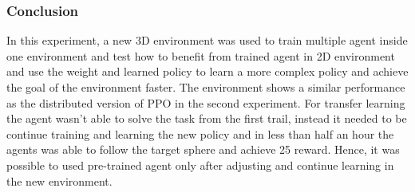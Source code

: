 \subsubsection{Conclusion}

In this experiment, a new 3D environment was used to train multiple agent inside one environment and test how to benefit from trained agent in 2D environment and use the weight and learned policy to learn a more complex policy and achieve the goal of the environment faster. The environment shows a similar performance as the distributed version of PPO in the second experiment. For transfer learning the agent wasn't able to solve the task from the first trail, instead it needed to be continue training and learning the new policy and in less than half an hour the agents was able to follow the target sphere and achieve 25 reward. Hence, it was possible to used pre-trained agent only after adjusting and continue learning in the new environment.